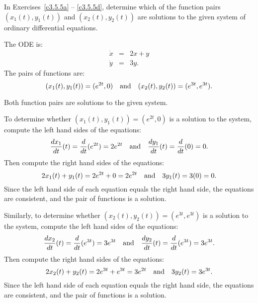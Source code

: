 \documentclass{ximera}
\begin{document}
\noindent In Exercises~\ref{c3.5.5a} -- \ref{c3.5.5d}, determine which of
the function pairs $(x_1(t),y_1(t))$ and $(x_2(t),y_2(t))$ are solutions
to the given system of ordinary differential equations.
\begin{exercise} \label{c3.5.5a}
The ODE is:
\begin{eqnarray*}
\dot{x} & = & 2x+y  \\
\dot{y} & = & 3y.
\end{eqnarray*}
The pairs of functions are:
\[
(x_1(t),y_1(t)) = (e^{2t},0)  \quad\mbox{and}\quad (x_2(t),y_2(t)) = (e^{3t},e^{3t}).
\]

\begin{solution}
\ans Both function pairs are solutions to the given system.

\soln To determine whether $(x_1(t),y_1(t)) = (e^{2t},0)$ is
a solution to the system, compute the left hand sides of the equations:
\[
\frac{dx_1}{dt}(t) = \frac{d}{dt}(e^{2t}) = 2e^{2t} \quad\mbox{and}\quad
\frac{dy_1}{dt}(t) = \frac{d}{dt}(0) = 0.
\]
Then compute the right hand sides of the equations:
\[
2x_1(t) + y_1(t) = 2e^{2t} + 0 = 2e^{2t} \quad\mbox{and}\quad
3y_1(t) = 3(0) = 0.
\]
Since the left hand side of each equation equals the right hand side, the
equations are consistent, and the pair of functions is a solution.

\para Similarly, to determine whether $(x_2(t),y_2(t)) = (e^{3t},e^{3t})$
is a solution to the system, compute the left hand sides of the equations:
\[
\frac{dx_2}{dt}(t) = \frac{d}{dt}(e^{3t}) = 3e^{3t} \quad\mbox{and}\quad
\frac{dy_2}{dt}(t) = \frac{d}{dt}(e^{3t}) = 3e^{3t}.
\]
Then compute the right hand sides of the equations:
\[
2x_2(t) + y_2(t) = 2e^{3t} + e^{3t} = 3e^{2t} \quad\mbox{and}\quad
3y_2(t) = 3e^{3t}.
\]
Since the left hand side of each equation equals the right hand side, the
equations are consistent, and the pair of functions is a solution.


\end{solution}
\end{exercise}
\end{document}
